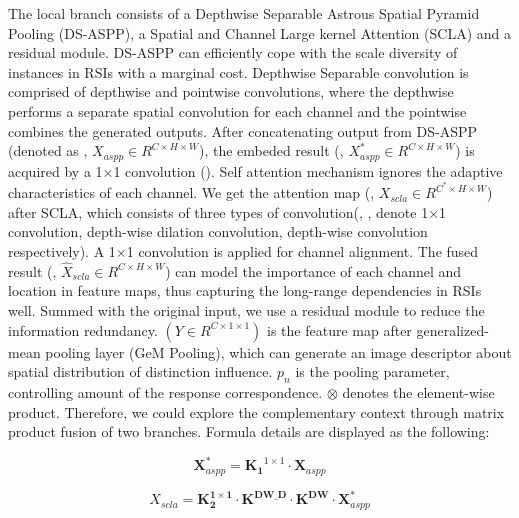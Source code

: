 \documentclass[lettersize,journal]{IEEEtran}
\begin{document}
The local branch consists of a Depthwise Separable Astrous Spatial Pyramid Pooling (DS-ASPP), a Spatial and Channel Large kernel Attention (SCLA) and a residual module. DS-ASPP can efficiently cope with the scale diversity of instances in RSIs with a marginal cost. Depthwise Separable convolution \cite{howardMobileNetsEfficientConvolutional2017} is comprised of depthwise and pointwise convolutions, where the depthwise performs a separate spatial convolution for each channel and the pointwise combines the generated outputs. After concatenating output from DS-ASPP (denoted as , $X_{aspp}\in R^{C\times H \times W}$), the embeded result (, $ X_{aspp}^{*}\in R^{C\times H \times W}$) is acquired by a 1×1 convolution (). Self attention mechanism ignores the adaptive characteristics of each channel. We get the attention map (, $ X_{scla}\in R^{C^{*}\times H \times W}$) after SCLA, which consists of three types of convolution(, , denote 1×1 convolution, depth-wise dilation convolution, depth-wise convolution respectively). A 1×1 convolution is applied for channel alignment. The fused result (, $ \hat{X}_{scla} \in R^{C\times H \times W}$) can model the importance of each channel and location in feature maps, thus capturing the long-range dependencies in RSIs well. Summed with the original input, we use a residual module to reduce the information redundancy.  $(Y\in R^{C\times 1 \times 1})$ is the feature map after generalized-mean pooling layer (GeM Pooling\cite{yangDOLGSingleStageImage2021}), which can generate an image descriptor about spatial distribution of distinction influence. $p_{n}$ is the pooling parameter, controlling amount of the response correspondence. $\otimes$ denotes the element-wise product. Therefore, we could explore the complementary context through matrix product fusion of two branches. Formula details are displayed as the following:

\begin{equation}
    \mathbf{X}_{aspp}^{*}=\mathbf{K_{1}}^{1\times 1} \cdot \mathbf{X}_{aspp}
    \label{eqASPP}
\end{equation}

\begin{equation}
    X_{scla} =  \mathbf{K_{2}^{1\times 1}} \cdot \mathbf{K^{DW\_D}} \cdot \mathbf{K^{DW}} \cdot \mathbf{X}_{aspp}^{*}
    \label{eqSCLA}
\end{equation}
\end{document}

